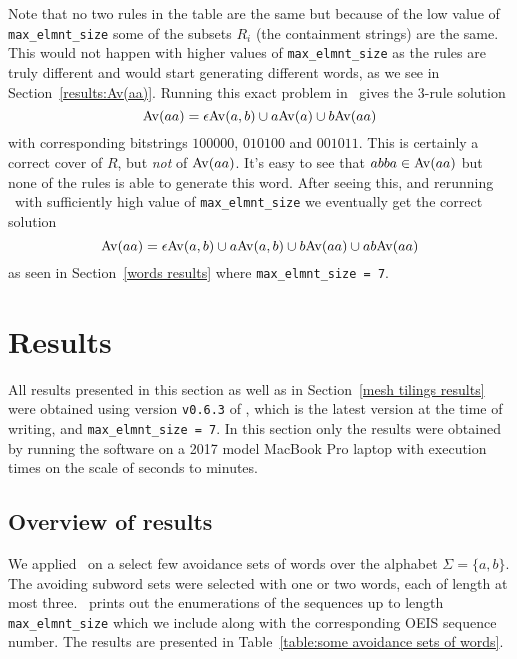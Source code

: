 Note that no two rules in the table are the same but because of the low value 
of \texttt{max\_elmnt\_size} some of the subsets $R_i$ (the containment strings) 
are the same. This would not happen with higher values of 
\texttt{max\_elmnt\_size} as the rules are truly different and would start 
generating different words, as we see in Section~\ref{results:Av(aa)}. Running 
this exact problem in \CombCov\ gives the 3-rule solution \[ {\mathrm{Av}\!\left(aa\right)} = 
\epsilon {\mathrm{Av}\!\left(a,b\right)} \cup a {\mathrm{Av}\!\left(a\right)} \cup b {\mathrm{Av}\!\left(aa\right)} \] with corresponding bitstrings 
$100000$, $010100$ and $001011$. This is certainly a correct cover of $R$, but 
\emph{not} of ${\mathrm{Av}\!\left(aa\right)}$. It's easy to see that $abba \in {\mathrm{Av}\!\left(aa\right)}$ but none of 
the rules is able to generate this word. After seeing this, and rerunning 
\CombCov\ with sufficiently high value of \texttt{max\_elmnt\_size} we 
eventually get the correct solution \[{\mathrm{Av}\!\left(aa\right)} = \epsilon {\mathrm{Av}\!\left(a,b\right)} \cup a 
{\mathrm{Av}\!\left(a,b\right)} \cup b {\mathrm{Av}\!\left(aa\right)} \cup ab {\mathrm{Av}\!\left(aa\right)}\] as seen in Section~\ref{words results} 
where \texttt{max\_elmnt\_size = 7}.


\section{Results\label{words results}}

All results presented in this section as well as in Section~\ref{mesh tilings 
results} were obtained using version \texttt{v0.6.3} of \CombCov, which is the 
latest version at the time of writing, and \texttt{max\_elmnt\_size = 7}. In 
this section only the results were obtained by running the software on a 2017 
model MacBook Pro laptop with execution times on the scale of seconds to 
minutes. 

\subsection{Overview of results}

We applied \CombCov\ on a select few avoidance sets of words over the alphabet 
$\Sigma = \{a,b\}$. The avoiding subword sets were selected with one or two 
words, each of length at most three. \CombCov\ prints out the enumerations of 
the sequences up to length \texttt{max\_elmnt\_size} which we include along with 
the corresponding OEIS \cite{oeis_foundation_inc._-line_2019} sequence number. 
The results are presented in Table~\ref{table:some avoidance sets of words}.

